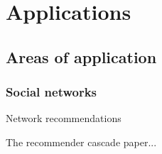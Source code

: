 \chapter{Applications}
\label{ch:applications}


\section{Areas of application}
\label{sect:app_areas}

	\subsection{Social networks}
	\label{ssect:social_networks}
	
	Network recommendations
	
	The recommender cascade paper...
	
